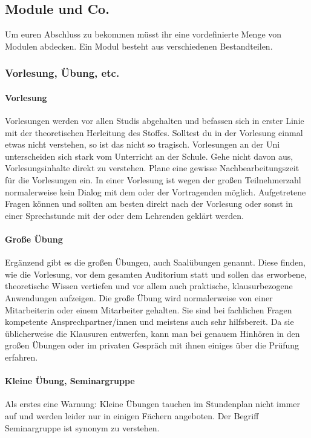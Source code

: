 \subsection{Module und Co.}
	Um euren Abschluss zu bekommen müsst ihr eine vordefinierte Menge von Modulen abdecken. Ein Modul besteht aus verschiedenen Bestandteilen.

\subsubsection{Vorlesung, Übung, etc.}
	\paragraph*{Vorlesung}
	Vorlesungen werden vor allen Studis abgehalten und befassen sich in erster Linie mit der theoretischen Herleitung des Stoffes. Solltest du in der Vorlesung einmal etwas nicht verstehen, so ist das nicht so tragisch. Vorlesungen an der Uni unterscheiden sich stark vom Unterricht an der Schule. Gehe nicht davon aus, Vorlesungsinhalte direkt zu verstehen. Plane eine gewisse Nachbearbeitungszeit für die Vorlesungen ein. In einer Vorlesung ist wegen der großen Teilnehmerzahl normalerweise kein Dialog mit dem oder der Vortragenden möglich. Aufgetretene Fragen können und sollten am besten direkt nach der Vorlesung oder sonst in einer Sprechstunde mit der oder dem Lehrenden geklärt werden.
	
	\paragraph*{Große Übung}
	Ergänzend gibt es die großen Übungen, auch Saalübungen genannt. Diese finden, wie die Vorlesung, vor dem gesamten Auditorium statt und sollen das erworbene, theoretische Wissen vertiefen und vor allem auch praktische, klausurbezogene Anwendungen aufzeigen. Die große Übung wird normalerweise von einer Mitarbeiterin oder einem Mitarbeiter gehalten. Sie sind bei  fachlichen Fragen kompetente Ansprechpartner/innen und meistens auch sehr hilfsbereit. Da sie  üblicherweise die Klausuren entwerfen, kann man bei genauem Hinhören in den großen Übungen oder im privaten Gespräch mit ihnen einiges über die Prüfung erfahren.

	\paragraph*{Kleine Übung, Seminargruppe}
	Als erstes eine Warnung: Kleine Übungen tauchen im Stundenplan nicht immer auf und werden leider nur in einigen Fächern angeboten. Der Begriff Seminargruppe ist synonym zu verstehen.
	
